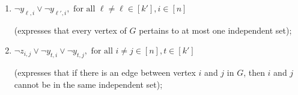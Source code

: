 \begin{definition}
\begin{enumerate}
\item  $\neg y_{\ell,i}\lor \neg y_{\ell',i}, \mbox{ for all } \ell\ne\ell\in[k'], i\in[n]$

(expresses that every vertex of $G$ pertains to at most one independent set);
\label{eq-clique-holes-r}%

\item $\neg z_{i,j}\lor \neg y_{t,i}\lor \neg y_{t,j}, \mbox{ for all } i\ne j\in[n],
t\in[k']$

(expresses that if there is an edge between vertex $i$ and $j$ in $G$, then
$i$ and $j$ cannot be in the same independent set);
\label{eq-clique-final-contradictory-clauses}
\end{enumerate}
\renewcommand{\theenumi}{(\Roman{enumi})}   %
\end{definition}



